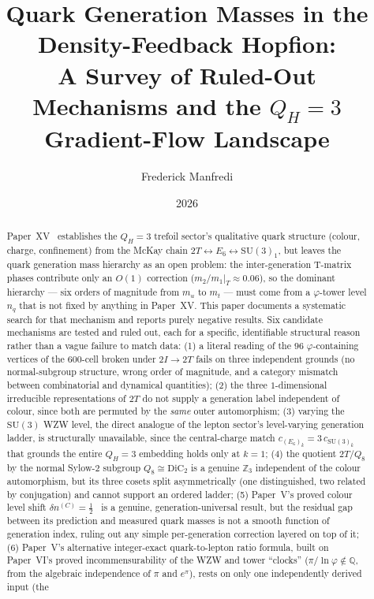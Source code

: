 \documentclass[11pt,a4paper]{article}
\title{\textbf{Quark Generation Masses in the Density-Feedback Hopfion:\\
A Survey of Ruled-Out Mechanisms and the $Q_H=3$ Gradient-Flow Landscape}}
\author{Frederick Manfredi}
\date{2026}
\theoremstyle{definition}\newtheorem{definition}[theorem]{Definition}
\theoremstyle{remark}
\theoremstyle{definition}\newtheorem{construction}[theorem]{Construction}
\newcommand{\vp}{\varphi}
\newcommand{\SU}{\mathrm{SU}}
\newcommand{\twoI}{2I}
\newcommand{\twoT}{2T}
\newcommand{\QH}{Q_H}
\begin{document}
\maketitle

\begin{abstract}
Paper~XV~\cite{Paper15} establishes the $\QH=3$ trefoil sector's
qualitative quark structure (colour, charge, confinement) from the
McKay chain $\twoT\leftrightarrow E_6\leftrightarrow\SU(3)_1$, but
leaves the quark generation mass hierarchy as an open problem: the
inter-generation T-matrix phases contribute only an $O(1)$ correction
($m_2/m_1|_T\approx0.06$), so the dominant hierarchy --- six orders of
magnitude from $m_u$ to $m_t$ --- must come from a $\vp$-tower level
$n_q$ that is not fixed by anything in Paper~XV. This paper documents
a systematic search for that mechanism and reports purely negative
results. Six candidate mechanisms are tested and ruled out, each for
a specific, identifiable structural reason rather than a vague failure
to match data: (1) a literal reading of the $96$ $\vp$-containing
vertices of the $600$-cell broken under $\twoI\to\twoT$ fails on three
independent grounds (no normal-subgroup structure, wrong order of
magnitude, and a category mismatch between combinatorial and
dynamical quantities); (2) the three $1$-dimensional irreducible
representations of $\twoT$ do not supply a generation label independent
of colour, since both are permuted by the \emph{same} outer
automorphism; (3) varying the $\SU(3)$ WZW level, the direct analogue
of the lepton sector's level-varying generation ladder, is
structurally unavailable, since the central-charge match
$c_{(E_6)_k}=3\,c_{\SU(3)_k}$ that grounds the entire $\QH=3$
embedding holds only at $k=1$; (4) the quotient $\twoT/Q_8$ by the
normal Sylow-$2$ subgroup $Q_8\cong\mathrm{DiC}_2$ is a genuine
$\mathbb{Z}_3$ independent of the colour automorphism, but its three
cosets split asymmetrically (one distinguished, two related by
conjugation) and cannot support an ordered ladder; (5) Paper~V's
proved colour level shift $\delta n^{(C)}=\tfrac12$~\cite{Paper5} is a
genuine, generation-universal result, but the residual gap between its
prediction and measured quark masses is not a smooth function of
generation index, ruling out any simple per-generation correction
layered on top of it; (6) Paper~V's alternative integer-exact
quark-to-lepton ratio formula, built on Paper~VI's proved
incommensurability of the WZW and tower ``clocks''
($\pi/\ln\vp\notin\mathbb{Q}$, from the algebraic independence of
$\pi$ and $e^\pi$), rests on only one independently derived input (the

\end{abstract}
\end{document}
